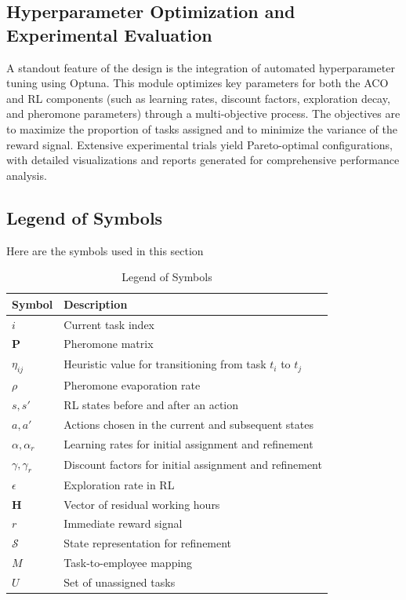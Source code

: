 \documentclass[conference]{IEEEtran}
\begin{document}
	\subsection{Hyperparameter Optimization and Experimental Evaluation}
	
	A standout feature of the design is the integration of automated hyperparameter tuning using Optuna. This module optimizes key parameters for both the ACO and RL components (such as learning rates, discount factors, exploration decay, and pheromone parameters) through a multi-objective process. The objectives are to maximize the proportion of tasks assigned and to minimize the variance of the reward signal. Extensive experimental trials yield Pareto-optimal configurations, with detailed visualizations and reports generated for comprehensive performance analysis.
	
	\subsection{Legend of Symbols}
	
	Here are the symbols used in this section
	
	\begin{table}[ht]
		\centering
		\footnotesize
		\caption{Legend of Symbols}
		\label{tab:legend}
		\renewcommand{\arraystretch}{1.15}
		\begin{tabularx}{\linewidth}{@{}lX@{}}
			\toprule
			\textbf{Symbol} & \textbf{Description} \\
			\midrule
			$i$ & Current task index \\
			$\mathbf{P}$ & Pheromone matrix \\
			$\eta_{ij}$ & Heuristic value for transitioning from task $t_i$ to $t_j$ \\
			$\rho$ & Pheromone evaporation rate \\
			$s, s'$ & RL states before and after an action \\
			$a, a'$ & Actions chosen in the current and subsequent states \\
			$\alpha, \alpha_r$ & Learning rates for initial assignment and refinement \\
			$\gamma, \gamma_r$ & Discount factors for initial assignment and refinement \\
			$\epsilon$ & Exploration rate in RL \\
			$\mathbf{H}$ & Vector of residual working hours \\
			$r$ & Immediate reward signal \\
			$\mathcal{S}$ & State representation for refinement \\
			$M$ & Task-to-employee mapping \\
			$U$ & Set of unassigned tasks \\
			\bottomrule
		\end{tabularx}
	\end{table}
	
\end{document}
